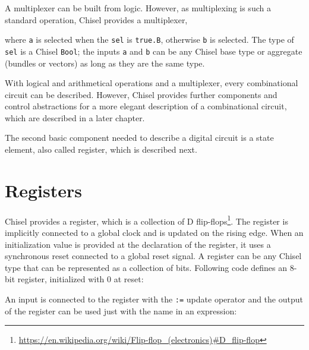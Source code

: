 \documentclass[%
    10pt,
    headinclude, footexclude,
    openright, %
    notitlepage,
    cleardoubleempty,
    headsepline,
    pointlessnumbers,
    bibtotoc, idxtotoc,
    ]{scrbook}
\newcommand{\code}[1]{{\small{\texttt{#1}}}}
\newcommand{\myref}[2]{\href{#1}{#2}}
\renewcommand{\myref}[2]{{#2}{\footnote{\url{#1}}}}
\begin{document}
A multiplexer can be built from logic.
However, as multiplexing  is such a standard operation, Chisel provides a multiplexer,


\noindent where \code{a} is selected when the \code{sel} is \code{true.B}, otherwise \code{b}
is selected. The type of \code{sel} is a Chisel \code{Bool}; the inputs \code{a} and \code{b}
can be any Chisel base type or aggregate (bundles or vectors) as long as they are the same
type.

With logical and arithmetical operations and a multiplexer, every combinational
circuit can be described. However, Chisel provides further components and control abstractions
for a more elegant description of a combinational circuit, which are described in
a later chapter.

The second basic component needed to describe a digital circuit is a state element,
also called register, which is described next.

\section{Registers}

Chisel provides a register, which is a collection of
\myref{https://en.wikipedia.org/wiki/Flip-flop\_(electronics)\#D\_flip-flop}{D flip-flops}.
The register is implicitly connected to a global clock and is updated on the rising edge.
When an initialization value is provided at the declaration of the register,
it uses a synchronous reset connected to a global reset signal.
A register can be any Chisel type that can be represented as a collection of bits.
Following code defines an 8-bit register, initialized with 0 at reset:


\noindent An input is connected to the register with the \code{:=} update operator and
the output of the register can be used just with the name in an expression:

\end{document}
